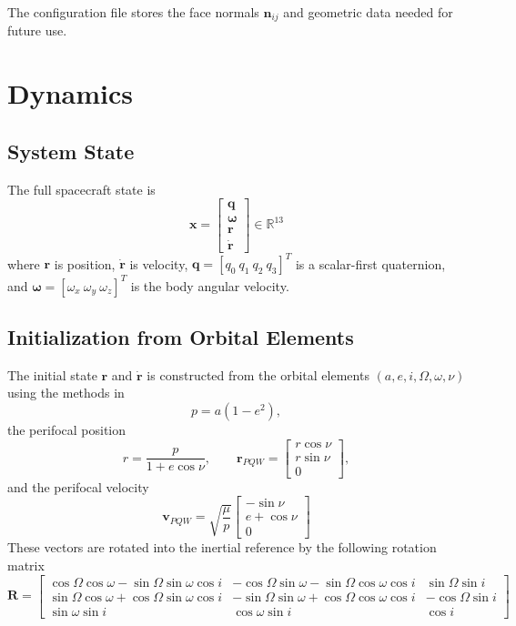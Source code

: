 \documentclass[conference,onecolumn,draftclsnofoot]{IEEEtran}
\begin{document}
The configuration file stores the face normals $\mathbf{n}_{ij}$ and geometric data needed for future use.

\clearpage
\section{Dynamics}

\subsection{System State}
The full spacecraft state is
\[
\mathbf{x} =
\begin{bmatrix}
\mathbf{q} \\ \boldsymbol{\omega} \\ \mathbf{r} \\ \mathbf{\dot{r}} 
\end{bmatrix}
\in \mathbb{R}^{13}
\]
where $\mathbf{r}$ is position, $\mathbf{\dot{r}}$ is velocity, $\mathbf{q} = [q_0\ q_1\ q_2\ q_3]^T$ is a scalar-first quaternion, and $\boldsymbol{\omega} = [\omega_x\ \omega_y\ \omega_z]^T$ is the body angular velocity.

\subsection{Initialization from Orbital Elements}

The initial state $\mathbf{r}$ and $\mathbf{\dot{r}}$ is constructed from the orbital elements $(a,e,i,\Omega,\omega,\nu)$ using the methods in \cite{markley2014fundamentals}
\begin{equation}
p = a(1-e^2),
\end{equation}
the perifocal position
\begin{equation}
r = \frac{p}{1+e\cos\nu},
\qquad
\mathbf{r}_{PQW} =
\begin{bmatrix}
r\cos\nu \\ r\sin\nu \\ 0
\end{bmatrix},
\end{equation}
and the perifocal velocity
\begin{equation}
\mathbf{v}_{PQW} = \sqrt{\frac{\mu}{p}}
\begin{bmatrix}
-\sin\nu \\ e+\cos\nu \\ 0
\end{bmatrix}
\end{equation}
These vectors are rotated into the inertial reference by the following rotation matrix
\begin{equation}
\mathbf{R} =
\begin{bmatrix}
\cos\Omega \cos\omega - \sin\Omega \sin\omega \cos i &
-\cos\Omega \sin\omega - \sin\Omega \cos\omega \cos i &
\sin\Omega \sin i \\[6pt]
\sin\Omega \cos\omega + \cos\Omega \sin\omega \cos i &
-\sin\Omega \sin\omega + \cos\Omega \cos\omega \cos i &
-\cos\Omega \sin i \\[6pt]
\sin\omega \sin i &
\cos\omega \sin i &
\cos i
\end{bmatrix}
\end{equation}
\vspace{0.5\baselineskip}
\end{document}
